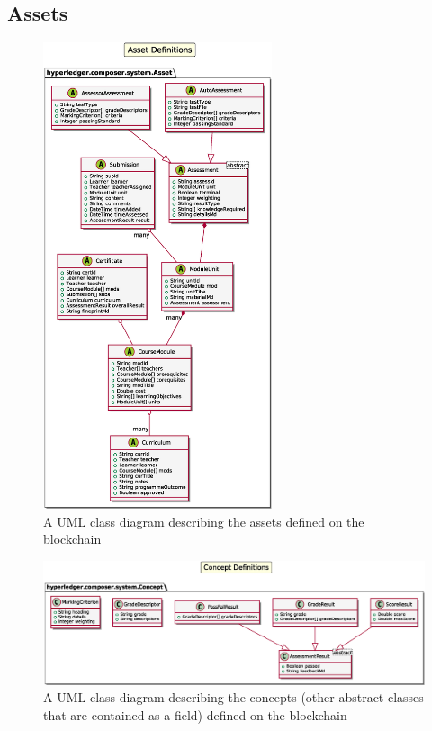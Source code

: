 \subsection{Assets}
\begin{figure}[!ht] 
    \centering    
    \includegraphics[width=0.6\textwidth]{assets}
    \caption[Assets Class Diagram]
        {A UML class diagram describing the assets defined on the blockchain} 
    \label{fig:assets}
\end{figure}

\begin{figure}[!ht] 
    \centering    
    \includegraphics[width=1.0\textwidth]{concepts}
    \caption[Concepts Class Diagram]
        {A UML class diagram describing the concepts (other abstract classes that are contained as a field) defined on the blockchain} 
    \label{fig:concepts}
\end{figure}

